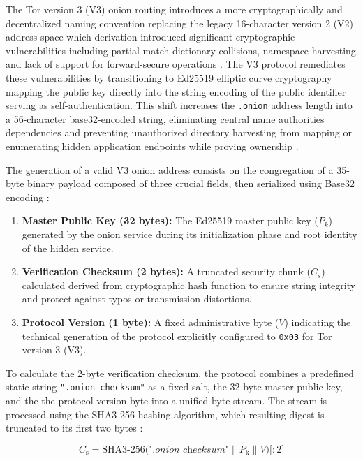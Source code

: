 \documentclass[conference]{IEEEtran}
\begin{document}
The Tor version 3 (V3) onion routing introduces a more cryptographically and decentralized naming convention replacing the legacy 16-character version 2 (V2) address space which derivation introduced significant cryptographic
vulnerabilities including partial-match dictionary collisions, namespace harvesting and lack of support for forward-secure operations \cite{tor_v2_deprecation, biryukov2013trawling}. The V3 protocol remediates these vulnerabilities by transitioning to Ed25519 elliptic curve
cryptography mapping the public key directly into the string encoding of the public identifier serving as self-authentication. This shift increases the \texttt{.onion} address length into a 56-character base32-encoded string,
eliminating central name authorities dependencies and preventing unauthorized directory harvesting from mapping or enumerating hidden application endpoints while proving ownership \cite{tor_rendspec}.

The generation of a valid V3 onion address consists on the congregation of a 35-byte binary payload composed of three crucial fields, then serialized using Base32 encoding \cite{tor_rendspec}:

\begin{enumerate}
    \item \textbf{Master Public Key (32 bytes):} The Ed25519 master public key ($\textit{P}_{k}$) generated by the onion service during its initialization phase and root identity of the hidden service.
    \item \textbf{Verification Checksum (2 bytes):} A truncated security chunk ($\textit{C}_{s}$) calculated derived from cryptographic hash function to ensure string integrity and protect against typos or transmission distortions.
    \item \textbf{Protocol Version (1 byte):} A fixed administrative byte ($\textit{V}$) indicating the technical generation of the protocol explicitly configured to \texttt{0x03} for Tor version 3 (V3).
\end{enumerate}

To calculate the 2-byte verification checksum, the protocol combines a predefined static string \texttt{".onion checksum"} as a fixed salt, the 32-byte master public key, and the the protocol version byte into a unified byte stream. 
The stream is processed using the SHA3-256 hashing algorithm, which resulting digest is truncated to its first two bytes \cite{tor_rendspec}:

\begin{equation}
\textit{C}_{\text{s}} = \text{SHA3-256}\big(\textit{".onion checksum"} \parallel \textit{P}_{\text{k}} \parallel \textit{V}\big)\big[:2\big]
\end{equation}
\end{document}
